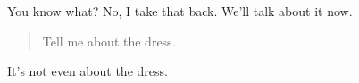 You know what? No, I take that back. We'll talk about it now.

\begin{quote}
Tell me about the dress.
\end{quote}

It's not even about the dress.
